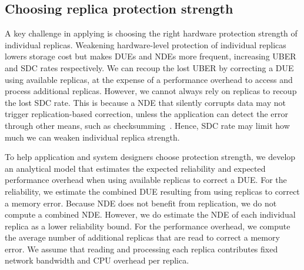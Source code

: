 \subsection{Choosing replica protection strength}

A key challenge in applying \ramp is choosing the right hardware protection strength of individual replicas. 
Weakening hardware-level protection of individual replicas lowers storage cost but makes DUEs and NDEs more frequent, increasing UBER and SDC rates respectively.
We can recoup the lost UBER by correcting a DUE using available replicas, at the expense of a performance overhead to access and process additional replicas.
However, we cannot always rely on replicas to recoup the lost SDC rate. 
This is because a NDE that silently corrupts data may not trigger replication-based correction, unless the application can detect the error through other means, such as checksumming~\cite{zhang:pangolin:atc:2019}.
Hence, SDC rate may limit how much we can weaken individual replica strength.


To help application and system designers choose protection strength, we develop an analytical model that estimates the expected reliability and expected performance overhead when using available replicas to correct a DUE. 
For the reliability, we estimate the combined DUE resulting from using replicas to correct a memory error. 
Because NDE does not benefit from replication, we do not compute a combined NDE. 
However, we do estimate the NDE of each individual replica as a lower reliability bound. 
For the performance overhead, we compute the average number of additional replicas that are read to correct a memory error.
We assume that reading and processing each replica contributes fixed network bandwidth and CPU overhead per replica.

